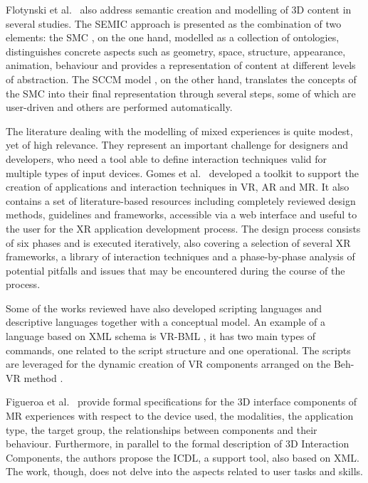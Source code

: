 Flotynski et al.~\cite{flotynski_conceptual_2015, flotynski_ontology-based_2017} also address semantic creation and modelling of 3D content in several studies. The SEMIC approach is presented as the combination of two elements: the SMC \cite{flotynski_semantic_2014, flotynski_semantic_2013, van_der_aalst_conceptual_2013}, on the one hand, modelled as a collection of ontologies, distinguishes concrete aspects such as geometry, space, structure, appearance, animation, behaviour and provides a representation of content at different levels of abstraction. The SCCM model \cite{mohler_semantic_2013}, on the other hand, translates the concepts of the SMC into their final representation through several steps, some of which are user-driven and others are performed automatically.

The literature dealing with the modelling of mixed experiences is quite modest, yet of high relevance. They represent an important challenge for designers and developers, who need a tool able to define interaction techniques valid for multiple types of input devices. Gomes et al.~\cite{gomes_extended_2020} developed a toolkit to support the creation of applications and interaction techniques in VR, AR and MR. It also contains a set of literature-based resources including completely reviewed design methods, guidelines and frameworks, accessible via a web interface and useful to the user for the XR application development process. The design process consists of six phases and is executed iteratively, also covering a selection of several XR frameworks, a library of interaction techniques and a phase-by-phase analysis of potential pitfalls and issues that may be encountered during the course of the process.

Some of the works reviewed have also developed scripting languages and descriptive languages together with a conceptual model. An example of a language based on XML schema is VR-BML \cite{walczak_structured_2008-1}, it has two main types of commands, one related to the script structure and one operational. The scripts are leveraged for the dynamic creation of VR components arranged on the Beh-VR method \cite{hutchison_beh-vr_2006}.

Figueroa et al.~\cite{figueroa_conceptual_2006} provide formal specifications for the 3D interface components of MR experiences with respect to the device used, the modalities, the application type, the target group, the relationships between components and their behaviour. Furthermore, in parallel to the formal description of 3D Interaction Components, the authors propose the ICDL, a support tool, also based on XML. The work, though, does not delve into the aspects related to user tasks and skills.


